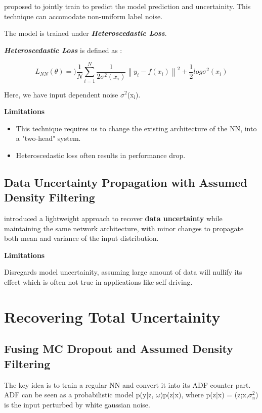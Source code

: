 \documentclass[a4paper]{article}
\begin{document}
\cite{kendall2017uncertainties} proposed to jointly train to predict the model prediction and uncertainity. This technique can accomodate non-uniform label noise. 

The model is trained under  \emph{\textbf{Heteroscedastic Loss}}.

\emph{\textbf{Heteroscedastic Loss}} is defined as :

\begin{equation}
L_{NN}(\theta) = )\frac{1}{N}\sum_{i=1}^{N}\frac{1}{2\sigma^2(x_i)}\left \| y_i - f(x_i) \right \|^2 + \frac{1}{2}log\sigma^2(x_i)
\end{equation}

Here, we have input dependent noise $\sigma$$^{\text{2}}$(x$_{\text{i}}$).

\textbf{Limitations}

\begin{itemize}
\item This technique requires us to change the existing architecture of the NN, into a "two-head" system.
\item Heteroscedastic loss often results in performance drop.
\end{itemize}


\subsection{Data Uncertainty Propagation with Assumed Density Filtering}
\label{sec-4-3}

\cite{gast2018lightweight} introduced a lightweight approach to recover \textbf{data uncertainty} while maintaining the same network architecture, with minor changes to propagate both mean and variance of the input distribution.



\textbf{Limitations} 

Disregards model uncertainity, assuming large amount of data will nullify its effect which is often not true in applications like self driving.

\section{Recovering Total Uncertainity}
\label{sec-5}

\subsection{Fusing MC Dropout and Assumed Density Filtering}
\label{sec-5-1}
The key idea is to train a regular NN and convert it into its ADF counter part.
ADF can be seen as a probabilistic model p(y|z, $\omega$)p(z|x), where p(z|x) = (z;x,$\sigma$$^{\text{2}}_{\text{n}}$) is the input perturbed by white gaussian noise.
\end{document}
